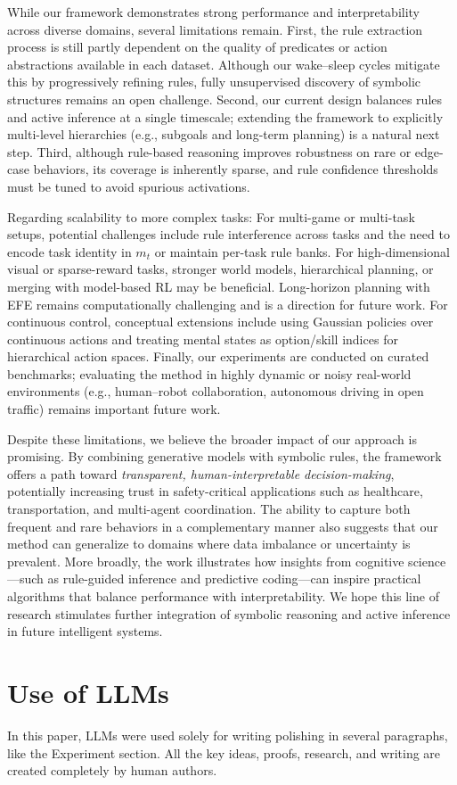 \documentclass{article} %
\newcommand{\revise}[1]{#1}
\begin{document}
While our framework demonstrates strong performance and interpretability across
diverse domains, several limitations remain. First, the rule extraction process
is still partly dependent on the quality of predicates or action abstractions
available in each dataset. Although our wake--sleep cycles mitigate this by
progressively refining rules, fully unsupervised discovery of symbolic structures
remains an open challenge. Second, our current design balances rules and active
inference at a single timescale; extending the framework to explicitly
multi-level hierarchies (e.g., subgoals and long-term planning) is a natural
next step. Third, although rule-based reasoning improves robustness on rare or
edge-case behaviors, its coverage is inherently sparse, and rule confidence
thresholds must be tuned to avoid spurious activations. 

\revise{Regarding scalability to more complex tasks: For multi-game or multi-task setups, potential challenges include rule interference across tasks and the need to encode task identity in $m_t$ or maintain per-task rule banks. For high-dimensional visual or sparse-reward tasks, stronger world models, hierarchical planning, or merging with model-based RL may be beneficial. Long-horizon planning with EFE remains computationally challenging and is a direction for future work. For continuous control, conceptual extensions include using Gaussian policies over continuous actions and treating mental states as option/skill indices for hierarchical action spaces.} Finally, our experiments
are conducted on curated benchmarks; evaluating the method in highly dynamic or
noisy real-world environments (e.g., human–robot collaboration, autonomous
driving in open traffic) remains important future work.

Despite these limitations, we believe the broader impact of our approach is
promising. By combining generative models with symbolic rules, the framework
offers a path toward \emph{transparent, human-interpretable decision-making},
potentially increasing trust in safety-critical applications such as healthcare,
transportation, and multi-agent coordination. The ability to capture both
frequent and rare behaviors in a complementary manner also suggests that our
method can generalize to domains where data imbalance or uncertainty is
prevalent. More broadly, the work illustrates how insights from cognitive
science---such as rule-guided inference and predictive coding---can inspire
practical algorithms that balance performance with interpretability. We hope
this line of research stimulates further integration of symbolic reasoning and
active inference in future intelligent systems.



\section{Use of LLMs}
\label{appendix_sec:use_of_llms}

In this paper, LLMs were used solely for writing polishing in several paragraphs, like the Experiment section. All the key ideas, proofs, research, and writing are created completely by human authors.
\end{document}
